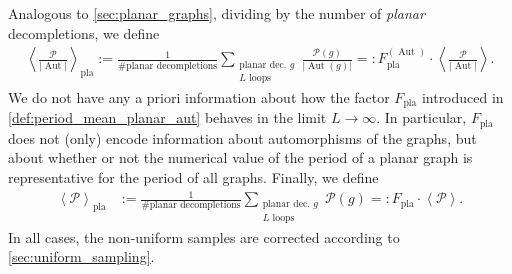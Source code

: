 \documentclass[11pt,a4paper]{article}
\newcommand{\abs}[1]{\lvert #1 \rvert}
\newcommand{\period}{\mathcal P}
\newcommand{\Aut}{\operatorname{Aut}}
\renewcommand{\|}{\rule[-0.4ex]{0.2ex}{1.2em}}
\begin{document}
Analogous to \cref{sec:planar_graphs}, dividing by the number of \emph{planar} decompletions, we define
\begin{align}\label{def:period_mean_planar_aut}
	\left \langle \frac{\period  }{\abs{\Aut }} \right \rangle _\text{pla} := \frac{1}{  \# \text{planar decompletions} } \sum_{\substack{ \text{planar dec. }g \\ L \text{ loops} }} \frac{\period (g)}{\abs{\Aut (g)}} =: F^{(\Aut)}_\text{pla} \cdot \left \langle \frac{\period}{\abs{\Aut}}  \right \rangle .
\end{align}
We do not have any a priori information about how the factor $F_\text{pla}$ introduced in  \cref{def:period_mean_planar_aut}  behaves in the limit $L\rightarrow \infty$. In particular, $F_\text{pla}$ does not (only) encode information about automorphisms of the graphs, but about whether or not the numerical value of the period of a planar graph is representative for the period of all graphs. Finally, we define
\begin{align}\label{def:period_mean_planar}
		\left \langle \period  \right \rangle _\text{pla} &:= \frac{1}{  \# \text{planar decompletions} } \sum_{\substack{ \text{planar dec. }g \\ L \text{ loops} }} \period (g) =: F_\text{pla} \cdot \left \langle \period  \right \rangle.  
\end{align}
In all cases, the non-uniform samples are corrected according to \cref{sec:uniform_sampling}.
\end{document}
